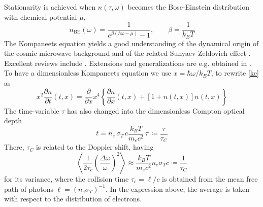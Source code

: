 \documentclass[a4paper,12pt,reqno,superscriptaddress,nofootinbib]{revtex4}
\theoremstyle{plain}
\theoremstyle{definition}
\theoremstyle{remark}
\newcommand{\0}{^{(0)}}
\newcommand{\1}{^{(1)}}
\newcommand{\2}{^{(2)}}
\begin{document}
Stationarity is achieved when $n(\tau,\omega)$ becomes the Bose-Einstein distribution with chemical potential $\mu$,
\[
n_\text{BE}(\omega) = \frac{1}{e^{\beta(\hbar\omega-\mu)} - 1},\qquad \beta =\frac{1}{k_BT}
\]
The Kompaneets equation yields a good understanding of the dynamical origin of the cosmic microwave background and of the related Sunyaev-Zeldovich effect \cite{sunyaeveffect,sunyaev}.  Excellent reviews include \cite{practical,gui,zeldovich}. Extensions and generalizations are e.g. obtained in \cite{buet, pitrou,barbosa, brown, itoh, itoh2, cooper, kohyama1, kohyama2, kohyama3,paper}.\\

To have a dimensionless Kompaneets equation we use $x= \hbar \omega/k_B T$, to rewrite \eqref{ke} as
\begin{equation}\label{ake}
x^2\frac{\partial n}{\partial t}(t,x) = \frac{\partial }{\partial x}x^4\left\{
\frac{\partial n}{\partial x}(t,x) + 
\left[1+n(t,x)\right]n(t,x)\right\}
\end{equation}
The time-variable $\tau$ has also changed into the dimensionless Compton optical depth
\[
t = n_e\, \sigma_T\, c \frac{ k_B T }{m_e c^2} \, \tau\,\coloneqq \frac{ \tau}{\tau_C}
\]
There, $\tau_C$ is related to the Doppler shift, having
\begin{equation}\label{shift}
\left\langle\frac{1}{2\tau_c}\left(\frac{\Delta\omega}{\omega}\right)^2\right\rangle\approx \frac{ k_B T }{m_e c^2} n_e \sigma_T c \coloneqq \frac{1}{\tau_C}
\end{equation} 
for its variance, where the collision time $\tau_c = \ell/c$ is obtained from the mean free path of photons $\ell=(n_e\sigma_T)^{-1}$. In the expression above, the average is taken with respect to the distribution of electrons.\\
\end{document}
